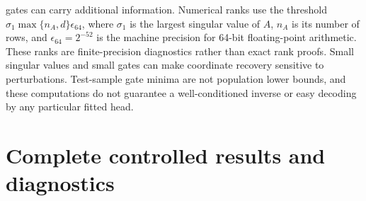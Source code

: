 gates can carry additional information. Numerical ranks use the threshold
$\sigma_1\max\{n_A,d\}\epsilon_{64}$, where $\sigma_1$ is the largest
singular value of $A$, $n_A$ is its number of rows, and
$\epsilon_{64}=2^{-52}$ is the machine precision for 64-bit floating-point
arithmetic. These ranks are finite-precision diagnostics rather than exact
rank proofs. Small singular values and small gates can make coordinate
recovery sensitive to perturbations. Test-sample gate minima are not population
lower bounds, and these computations do not guarantee a well-conditioned inverse
or easy decoding by any particular fitted head.
\begin{table}[htbp]
\caption{Retrospective diagnostics over 24 stored banks per row. Rank ranges concern
the stacked local bases in input dimension $d$. The smallest singular value and
gate entries are minima over the inspected banks (and, for gates, their original
test observations). The condition number $\kappa_2$ is the ratio of the
largest to the smallest singular value for a full-column-rank stack; the
table reports its maximum over the inspected banks. A dash means
that not every stack in that row has full numerical column rank. KAHM and affine
representations share the basis stack. Computational reproduction supplies no new
independent statistical replications.}
\label{c:tab:review-banks}
\centering\small\setlength{\tabcolsep}{3pt}

\end{table}


\clearpage
\section{Complete controlled results and diagnostics}\label{c:app:tables}

\begin{table}[!htbp]
 \caption{The six primary branch settings at 1,024 training points:
 mean ridge test MSE over 24 repetitions, with the primary KAHM advantage
 $G$ and its interval from the 29-comparison family. The Bayes MSE is
 $1/300$. The affine-locality scoring control reuses the shared references
 and is secondary.}
 \label{c:tab:branch}
 \centering\small\setlength{\tabcolsep}{3pt}
 
\end{table}

\begin{table}[!htbp]
 \caption{All nine first-stage primary settings: mean test MSE over
 24 repetitions for ridge decoders. The local-coordinate improvement $L$
 and its interval belong to the 29-comparison family. Retaining local
 position substantially improves KAHM prediction in eight settings;
 KAHM local coordinates do not dominate affine local coordinates.}
 \label{c:tab:ridge}
 \centering\small\setlength{\tabcolsep}{3pt}
 
\end{table}

